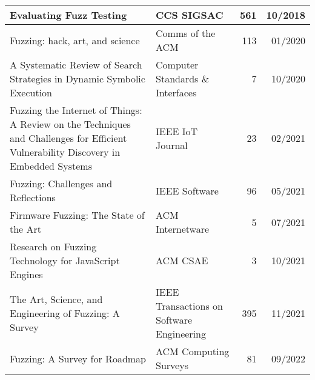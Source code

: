 \documentclass{article}
\begin{document}
{\begin{longtable}{|p{}|p{}|r|r|}
      Evaluating Fuzz Testing\cite{EvaluatingFuzzTesting}                                                                                           & CCS SIGSAC                                                 & 561            & 10/2018       \\\hline
      Fuzzing: hack, art, and science\cite{HackArtScience}                                                                                          & Comms of the ACM                                           & 113            & 01/2020       \\\hline
      A Systematic Review of Search Strategies in Dynamic Symbolic Execution\cite{SearchStrategies}                                                 & Computer Standards \& Interfaces                           & 7              & 10/2020       \\\hline
      Fuzzing the Internet of Things: A Review on the Techniques and Challenges for Efficient Vulnerability Discovery in Embedded Systems\cite{IoT} & IEEE IoT Journal                                           & 23             & 02/2021       \\\hline
      Fuzzing: Challenges and Reflections\cite{ChallengesAndReflections}                                                                            & IEEE Software                                              & 96             & 05/2021       \\\hline
      Firmware Fuzzing: The State of the Art\cite{Firmware}                                                                                         & ACM Internetware                                           & 5              & 07/2021       \\\hline
      Research on Fuzzing Technology for JavaScript Engines\cite{JavaScript}                                                                        & ACM CSAE                                                   & 3              & 10/2021       \\\hline
      The Art, Science, and Engineering of Fuzzing: A Survey\cite{ArtScienceEngineeringFuzzing}                                                     & IEEE Transactions on Software Engineering                  & 395            & 11/2021       \\\hline
      Fuzzing: A Survey for Roadmap\cite{FuzzingASurveyforRoadmap}                                                                                  & ACM Computing Surveys                                      & 81             & 09/2022       \\\hline

\end{longtable}}
\end{document}
